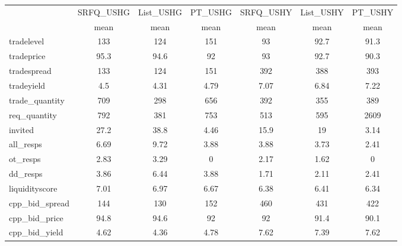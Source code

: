 \begin{tabular}{l*{6}{c}}
                              &\multicolumn{1}{c}{SRFQ\_USHG}&\multicolumn{1}{c}{List\_USHG}&\multicolumn{1}{c}{PT\_USHG}&\multicolumn{1}{c}{SRFQ\_USHY}&\multicolumn{1}{c}{List\_USHY}&\multicolumn{1}{c}{PT\_USHY}\\
                              &         mean&         mean&         mean&         mean&         mean&         mean\\
tradelevel                    &          133&          124&          151&           93&         92.7&         91.3\\
tradeprice                    &         95.3&         94.6&           92&           93&         92.7&         90.3\\
tradespread                   &          133&          124&          151&          392&          388&          393\\
tradeyield                    &          4.5&         4.31&         4.79&         7.07&         6.84&         7.22\\
trade\_quantity                &          709&          298&          656&          392&          355&          389\\
req\_quantity                  &          792&          381&          753&          513&          595&         2609\\
invited                       &         27.2&         38.8&         4.46&         15.9&           19&         3.14\\
all\_resps                     &         6.69&         9.72&         3.88&         3.88&         3.73&         2.41\\
ot\_resps                      &         2.83&         3.29&            0&         2.17&         1.62&            0\\
dd\_resps                      &         3.86&         6.44&         3.88&         1.71&         2.11&         2.41\\
liquidityscore                &         7.01&         6.97&         6.67&         6.38&         6.41&         6.34\\
cpp\_bid\_spread                &          144&          130&          152&          460&          431&          422\\
cpp\_bid\_price                 &         94.8&         94.6&           92&           92&         91.4&         90.1\\
cpp\_bid\_yield                 &         4.62&         4.36&         4.78&         7.62&         7.39&         7.62\\

\end{tabular}
